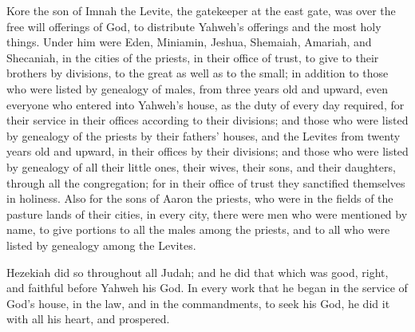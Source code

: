 {Kore the son of Imnah the Levite, the gatekeeper at the east gate, was over the free will offerings of God, to distribute Yahweh’s offerings and the most holy things.
Under him were Eden, Miniamin, Jeshua, Shemaiah, Amariah, and Shecaniah, in the cities of the priests, in their office of trust, to give to their brothers by divisions, to the great as well as to the small;
in addition to those who were listed by genealogy of males, from three years old and upward, even everyone who entered into Yahweh’s house, as the duty of every day required, for their service in their offices according to their divisions;
and those who were listed by genealogy of the priests by their fathers’ houses, and the Levites from twenty years old and upward, in their offices by their divisions;
and those who were listed by genealogy of all their little ones, their wives, their sons, and their daughters, through all the congregation; for in their office of trust they sanctified themselves in holiness.
Also for the sons of Aaron the priests, who were in the fields of the pasture lands of their cities, in every city, there were men who were mentioned by name, to give portions to all the males among the priests, and to all who were listed by genealogy among the Levites.
\par }{\PP {}Hezekiah did so throughout all Judah; and he did that which was good, right, and faithful before Yahweh his God.
In every work that he began in the service of God’s house, in the law, and in the commandments, to seek his God, he did it with all his heart, and prospered.

}
